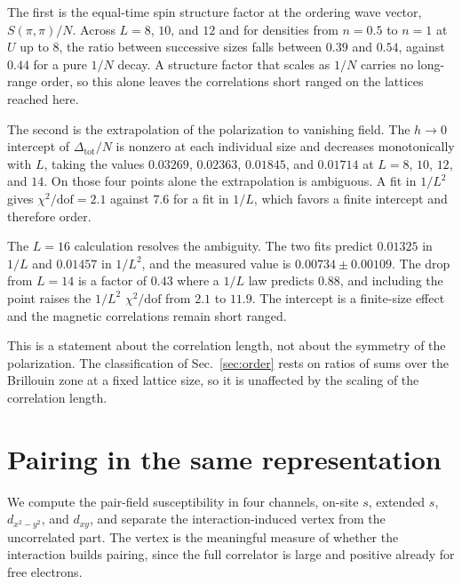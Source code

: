 \documentclass[aps,prb,reprint,superscriptaddress,amsmath,amssymb,floatfix]{revtex4-2}
\begin{document}
The first is the equal-time spin structure factor at the ordering wave vector,
$S(\pi,\pi)/N$. Across $L = 8$, $10$, and $12$ and for densities from
$n = 0.5$ to $n = 1$ at $U$ up to $8$, the ratio between successive sizes falls
between $0.39$ and $0.54$, against $0.44$ for a pure $1/N$ decay. A structure
factor that scales as $1/N$ carries no long-range order, so this alone leaves
the correlations short ranged on the lattices reached here.

The second is the extrapolation of the polarization to vanishing field. The
$h \to 0$ intercept of $\Delta_{\mathrm{tot}}/N$ is nonzero at each individual size and decreases
monotonically with $L$, taking the values $0.03269$, $0.02363$, $0.01845$, and
$0.01714$ at $L = 8$, $10$, $12$, and $14$. On those four points alone the
extrapolation is ambiguous. A fit in $1/L^2$ gives $\chi^2/\mathrm{dof} = 2.1$
against $7.6$ for a fit in $1/L$, which favors a finite intercept and therefore
order.

The $L = 16$ calculation resolves the ambiguity. The two fits predict $0.01325$
in $1/L$ and $0.01457$ in $1/L^2$, and the measured value is
$0.00734 \pm 0.00109$. The drop from $L = 14$ is a factor of $0.43$ where a
$1/L$ law predicts $0.88$, and including the point raises the $1/L^2$
$\chi^2/\mathrm{dof}$ from $2.1$ to $11.9$. The intercept is a finite-size
effect and the magnetic correlations remain short ranged.

This is a statement about the correlation length, not about the symmetry of the
polarization. The classification of Sec.~\ref{sec:order} rests on ratios of
sums over the Brillouin zone at a fixed lattice size, so it is unaffected by the
scaling of the correlation length.


\section{Pairing in the same representation}
\label{sec:pairing}

We compute the pair-field susceptibility in four channels, on-site $s$,
extended $s$, $d_{x^2-y^2}$, and $d_{xy}$, and separate the interaction-induced
vertex from the uncorrelated part. The vertex is the meaningful measure of
whether the interaction builds pairing, since the full correlator is large and
positive already for free electrons.
\end{document}
